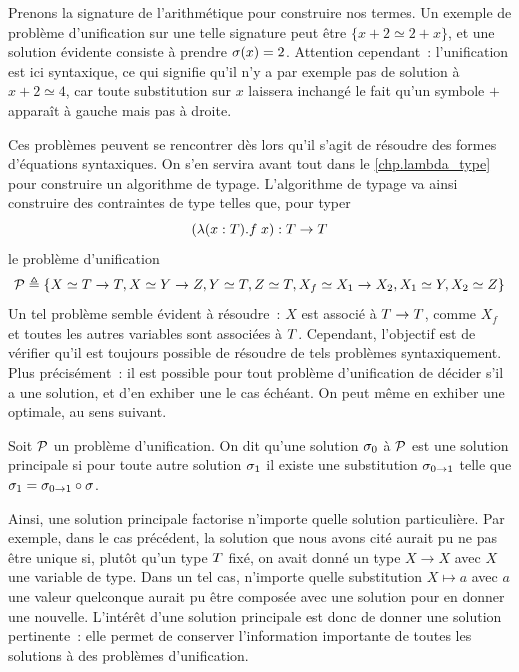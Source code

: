 \begin{example}
  Prenons la signature de l'arithmétique pour construire nos
  termes. Un exemple de problème d'unification sur une telle
  signature peut être $\{ x + 2 \simeq 2 + x\}$, et une solution
  évidente consiste à prendre $\sigma(x) = 2$. Attention cependant~:
  l'unification est ici syntaxique, ce qui signifie qu'il n'y a
  par exemple pas de solution à $x + 2 \simeq 4$, car toute
  substitution sur $x$ laissera inchangé le fait qu'un symbole
  $+$ apparaît à gauche mais pas à droite.
\end{example}

Ces problèmes peuvent se rencontrer dès lors qu'il s'agit de
résoudre des formes d'équations syntaxiques. On s'en servira
avant tout dans le \cref{chp.lambda_type} pour construire un
algorithme de typage. L'algorithme de typage va ainsi construire
des contraintes de type telles que, pour typer
\[(\lambda (x : T). f\;x) : T \to T\]
le problème d'unification
\[\mathcal{P}\triangleq\{X \simeq T \to T, X \simeq Y \to Z,
Y \simeq T, Z\simeq T,X_f \simeq X_1 \to X_2,
X_1 \simeq Y, X_2 \simeq Z\}\]
Un tel problème semble évident à résoudre~: $X$ est associé à
$T \to T$, comme $X_f$ et toutes les autres
variables sont associées à $T$. Cependant, l'objectif
est de vérifier qu'il est toujours possible de résoudre de tels
problèmes syntaxiquement. Plus précisément~: il est possible pour
tout problème d'unification de décider s'il a une solution, et
d'en exhiber une le cas échéant. On peut même en exhiber une
optimale, au sens suivant.

\begin{definition}
  Soit $\mathcal{P}$ un problème d'unification. On dit qu'une solution
  $\sigma_0$ à $\mathcal{P}$ est une solution principale si pour
  toute autre solution $\sigma_1$ il existe une substitution
  $\sigma_{0\to 1}$ telle que
  $\sigma_1 = \sigma_{0 \to 1} \circ \sigma$.
\end{definition}

Ainsi, une solution principale factorise n'importe quelle solution
particulière. Par exemple, dans le cas précédent, la solution
que nous avons cité aurait pu ne pas être unique si, plutôt qu'un
type $T$ fixé, on avait donné un type $X \to X$ avec $X$
une variable de type. Dans un tel cas, n'importe quelle
substitution $X \mapsto a$ avec $a$ une valeur quelconque aurait
pu être composée avec une solution pour en donner une nouvelle.
L'intérêt d'une solution principale est donc de donner une solution
pertinente~: elle permet de conserver l'information importante de
toutes les solutions à des problèmes d'unification.

